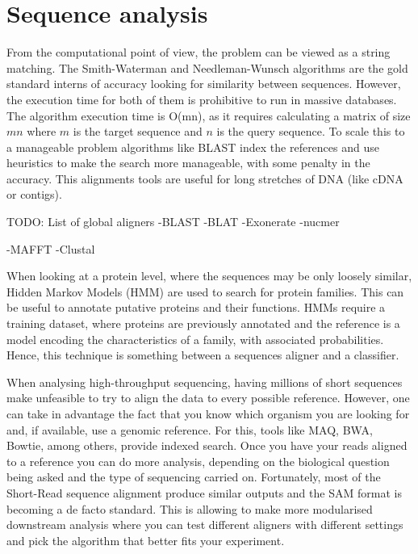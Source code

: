 \section{Sequence analysis}




From the computational point of view, the problem can be viewed as a string matching. The Smith-Waterman\cite{Smith1981} and Needleman-Wunsch\cite{Needleman1970} algorithms are the gold standard interns of accuracy looking for similarity between sequences. However, the execution time for both of them is prohibitive to run in massive databases. The algorithm execution time is O(mn), as it requires calculating a matrix of size $mn$ where $m$ is the target sequence and $n$ is the query sequence.  To scale this to a manageable problem algorithms like BLAST index the references and use heuristics to make the search more manageable, with some penalty in the accuracy. This alignments tools are useful for long stretches of DNA (like cDNA or contigs)\cite{Altschul1990}.

TODO: List of global aligners
-BLAST
-BLAT
-Exonerate
-nucmer

-MAFFT
-Clustal


When looking at a protein level, where the sequences may be only loosely similar, Hidden Markov Models (HMM) are used to search for protein families. This can be useful to annotate putative proteins and their functions. HMMs require a training dataset, where proteins are previously annotated and the reference is a model encoding the characteristics of a family, with associated probabilities. Hence, this technique is something between a sequences aligner and a classifier\cite{Eddy2004}. 

When analysing high-throughput sequencing, having millions of short sequences make unfeasible to try to align the data to every possible reference. However, one can take in advantage the fact that you know which organism you are looking for and, if available, use a genomic reference. For this, tools like MAQ, BWA, Bowtie, among others, provide indexed search.  Once you have your reads aligned to a reference you can do more analysis, depending on the biological question being asked and the type of sequencing carried on.  Fortunately, most of the Short-Read sequence alignment produce similar outputs and the SAM format is becoming a de facto standard. This is allowing to make more modularised downstream analysis where you can test different aligners with different settings and pick the algorithm that better fits your experiment\cite{Liu2012,Li2009,Li2009a}. 

